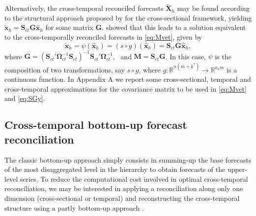 \documentclass[a4paper,11pt]{article}
\newcommand{\xvet}{\bm{x}}
\newcommand{\Gvet}{\bm{G}}
\newcommand{\Mvet}{\bm{M}}
\newcommand{\Svet}{\bm{S}}
\newcommand{\Xvet}{\bm{X}}
\newcommand{\Omegavet}{\bm{\Omega}}
\theoremstyle{definition}
\begin{document}
Alternatively, the cross-temporal reconciled forecasts $\widetilde{\Xvet}_{h}$ may be found according to the structural approach proposed by \cite{hyndman2011} for the cross-sectional framework, yielding $\widetilde{\xvet}_h = \Svet_{ct}\Gvet \widehat{\xvet}_h$ for some matrix $\Gvet$. \citet{wickramasuriya2019} showed that this leads to a solution equivalent to the cross-temporally reconciled forecasts in \eqref{eq:Mvet}, given by
\begin{equation}\label{eq:SGy}
	\widetilde{\xvet}_{h} = \psi\left(\widehat{\xvet}_h \right) = \left(s \circ g \right)\left(\widehat{\xvet}_h\right)=\Svet_{ct}\Gvet \widehat{\xvet}_{h},
\end{equation}
where $\Gvet = (\Svet_{ct}' \Omegavet_{ct}^{-1}\Svet_{ct})^{-1} \Svet_{ct}'\Omegavet_{ct}^{-1}$,~ and $\Mvet = \Svet_{ct} \Gvet$. In this case, $\psi$ is the composition of two transformations, say $s \circ g$, where $g: \mathbb{R}^{n(m+k^\ast)} \rightarrow \mathbb{R}^{n_b m}$ is a continuous function. In Appendix A we report some cross-sectional, temporal and cross-temporal approximations for the covariance matrix to be used in \eqref{eq:Mvet} and \eqref{eq:SGy}.

\subsection{Cross-temporal bottom-up forecast reconciliation}\label{ssec:ctbu}

The classic bottom-up approach \citep{dunn1976, dangerfield1992} simply consists in summing-up the base forecasts of the most disaggregated level in the hierarchy to obtain forecasts of the upper-level series. To reduce the computational cost involved in optimal cross-temporal reconciliation, we may be interested in applying a reconciliation along only one dimension (cross-sectional or temporal) and reconstructing the cross-temporal structure using a partly bottom-up approach \citep{difonzo2022b, difonzo2023a, sanguri2022}.
\end{document}
